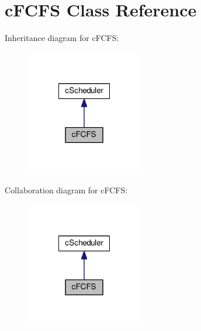\hypertarget{classcFCFS}{\section{c\-F\-C\-F\-S \-Class \-Reference}
\label{d6/dc3/classcFCFS}
}


\-Inheritance diagram for c\-F\-C\-F\-S\-:\nopagebreak
\begin{figure}[H]
\begin{center}
\leavevmode
\includegraphics[width=144pt]{d2/d94/classcFCFS__inherit__graph}
\end{center}
\end{figure}


\-Collaboration diagram for c\-F\-C\-F\-S\-:\nopagebreak
\begin{figure}[H]
\begin{center}
\leavevmode
\includegraphics[width=144pt]{d4/d8d/classcFCFS__coll__graph}
\end{center}
\end{figure}
